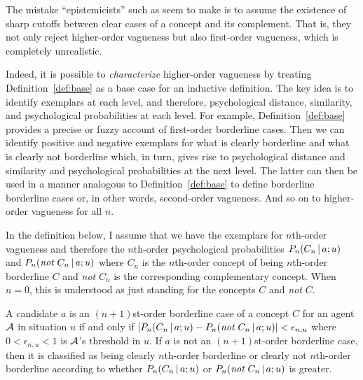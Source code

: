 
The mistake ``epistemicists'' such as \citet{williamson:v} seem to make is to assume the existence of sharp cutoffs between clear cases of a concept and its complement. That is, they not only reject higher-order vagueness but also first-order vagueness, which is completely unrealistic. 


Indeed, it is possible to \emph{characterize} higher-order vagueness by treating Definition~\ref{def:base} as a base case for an inductive definition. The key idea is to identify exemplars at each level, and therefore, psychological distance, similarity, and psychological probabilities at each level. For example, Definition~\ref{def:base} provides a precise or fuzzy account of first-order borderline cases. Then we can identify positive and negative exemplars for what is clearly borderline and what is clearly not borderline which, in turn, gives rise to psychological distance and similarity and psychological probabilities at the next level. The latter can then be used in a manner analogous to Definition~\ref{def:base} to define borderline borderline cases or, in other words, second-order vagueness. And so on to higher-order vagueness for all $n$. 

In the definition below, I assume that we have the exemplars for $n$th-order vagueness and therefore the $n$th-order psychological probabilities $P_n(C_n \,|\, a; u)$ and $P_n(\emph{not}\ C_n \,|\, a; u)$ where $C_n$ is the $n$th-order concept of being $n$th-order borderline $C$ and \emph{not} $C_n$ is the corresponding complementary concept. When $n = 0$, this is understood as just standing for the concepts $C$ and \emph{not} $C$.

\begin{definition}\label{def:hov}
A candidate $a$ is an $(n + 1)$st-order borderline case of a concept $C$ for an agent $\cal A$ in situation $u$ if and only if $|P_n(C_n \,|\, a; u) - P_n(\emph{not}\ C_n \,|\, a; u)| < \epsilon_{n,u}$ where $0 < \epsilon_{n,u} < 1$ is $\cal A$'s threshold in $u$. If $a$ is not an $(n + 1)$st-order borderline case, then it is classified as being clearly $n$th-order borderline or clearly not $n$th-order borderline according to whether $P_n(C_n \,|\, a; u)$ or $P_n(\emph{not}\ C_n \,|\, a; u)$ is greater.
\end{definition}

